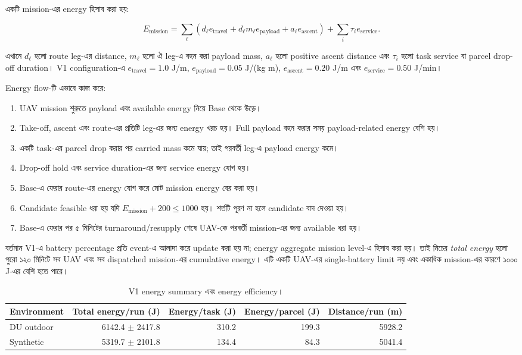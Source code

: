 \documentclass[10pt,a4paper]{article}
\begin{document}
একটি mission-এর energy হিসাব করা হয়:

\begin{equation}
E_{\mathrm{mission}} = \sum_{\ell}\left(d_{\ell}e_{\mathrm{travel}} + d_{\ell}m_{\ell}e_{\mathrm{payload}} + a_{\ell}e_{\mathrm{ascent}}\right) + \sum_i \tau_i e_{\mathrm{service}}.
\end{equation}

এখানে $d_{\ell}$ হলো route leg-এর distance, $m_{\ell}$ হলো ঐ leg-এ বহন করা payload mass, $a_{\ell}$ হলো positive ascent distance এবং $\tau_i$ হলো task service বা parcel drop-off duration। V1 configuration-এ $e_{\mathrm{travel}}=1.0$ J/m, $e_{\mathrm{payload}}=0.05$ J/(kg m), $e_{\mathrm{ascent}}=0.20$ J/m এবং $e_{\mathrm{service}}=0.50$ J/min।

Energy flow-টি এভাবে কাজ করে:

\begin{enumerate}
\item UAV mission শুরুতে payload এবং available energy নিয়ে Base থেকে উড়ে।
\item Take-off, ascent এবং route-এর প্রতিটি leg-এর জন্য energy খরচ হয়। Full payload বহন করার সময় payload-related energy বেশি হয়।
\item একটি task-এর parcel drop করার পর carried mass কমে যায়; তাই পরবর্তী leg-এ payload energy কমে।
\item Drop-off hold এবং service duration-এর জন্য service energy যোগ হয়।
\item Base-এ ফেরার route-এর energy যোগ করে মোট mission energy বের করা হয়।
\item Candidate feasible ধরা হয় যদি $E_{\mathrm{mission}}+200 \leq 1000$ হয়। শর্তটি পূরণ না হলে candidate বাদ দেওয়া হয়।
\item Base-এ ফেরার পর ৫ মিনিটের turnaround/resupply শেষে UAV-কে পরবর্তী mission-এর জন্য available ধরা হয়।
\end{enumerate}

বর্তমান V1-এ battery percentage প্রতি event-এ আলাদা করে update করা হয় না; energy aggregate mission level-এ হিসাব করা হয়। তাই নিচের \textit{total energy} হলো পুরো ১২০ মিনিটে সব UAV এবং সব dispatched mission-এর cumulative energy। এটি একটি UAV-এর single-battery limit নয় এবং একাধিক mission-এর কারণে ১০০০ J-এর বেশি হতে পারে।

\begin{table}[htbp]
\centering
\caption{V1 energy summary এবং energy efficiency।}
\label{tab:energy-summary-bn}
\scriptsize
{}
\begin{tabular}{@{}lrrrr@{}}
\toprule
Environment & Total energy/run (J) & Energy/task (J) & Energy/parcel (J) & Distance/run (m) \\
\midrule
DU outdoor & 6142.4 $\pm$ 2417.8 & 310.2 & 199.3 & 5928.2 \\
Synthetic & 5319.7 $\pm$ 2101.8 & 134.4 & 84.3 & 5041.4 \\
\bottomrule
\end{tabular}
\end{table}
\end{document}
